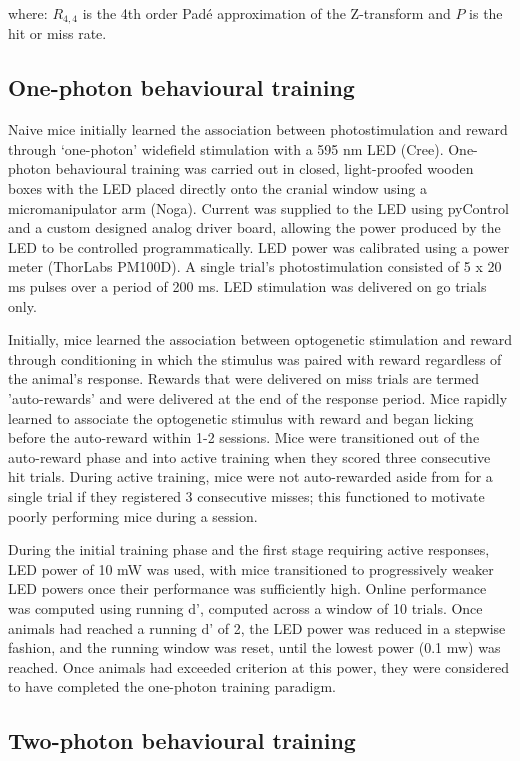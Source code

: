 where: $R_{4,4}$ is the 4th order Pad\'e approximation of the Z-transform and $P$ is the hit or miss rate.

\subsection{One-photon behavioural training}

Naive mice initially learned the association between photostimulation and reward through ‘one-photon’ widefield stimulation with a 595 nm LED (Cree). One-photon behavioural training was carried out in closed, light-proofed wooden boxes with the LED placed directly onto the cranial window using a micromanipulator arm (Noga). Current was supplied to the LED using pyControl and a custom designed analog driver board, allowing the power produced by the LED to be controlled programmatically. LED power was calibrated using a power meter (ThorLabs PM100D). A single trial's photostimulation consisted of 5 x 20 ms pulses over a period of 200 ms. LED stimulation was delivered on go trials only.

Initially, mice learned the association between optogenetic stimulation and reward through conditioning in which the stimulus was paired with reward regardless of the animal's response. Rewards that were delivered on miss trials are termed 'auto-rewards' and were delivered at the end of the response period. Mice rapidly learned to associate the optogenetic stimulus with reward and began licking before the auto-reward within 1-2 sessions. Mice were transitioned out of the auto-reward phase and into active training when they scored three consecutive hit trials. During active training, mice were not auto-rewarded aside from for a single trial if they registered 3 consecutive misses; this functioned to motivate poorly performing mice during a session.

During the initial training phase and the first stage requiring active responses,  LED power of 10 mW was used, with mice transitioned to progressively weaker LED powers once their performance was sufficiently high. Online performance was computed using running d', computed across a window of 10 trials. Once animals had reached a running d' of 2, the LED power was reduced in a stepwise fashion, and the running window was reset, until the lowest power (0.1 mw) was reached. Once animals had exceeded criterion at this power, they were considered to have completed the one-photon training paradigm.

\subsection{Two-photon behavioural training}

